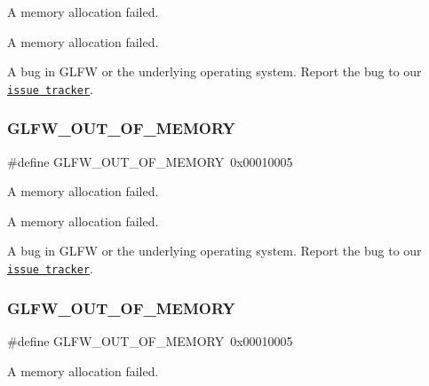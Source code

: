 A memory allocation failed. 

A memory allocation failed.

A bug in G\+L\+FW or the underlying operating system. Report the bug to our \href{https://github.com/glfw/glfw/issues}{\tt issue tracker}. \mbox{\label{group__errors_ga9023953a2bcb98c2906afd071d21ee7f}} 
\subsubsection{\texorpdfstring{G\+L\+F\+W\+\_\+\+O\+U\+T\+\_\+\+O\+F\+\_\+\+M\+E\+M\+O\+RY}{GLFW\_OUT\_OF\_MEMORY}\hspace{0.1cm}{\footnotesize\ttfamily [4/5]}}
{\footnotesize\ttfamily \#define G\+L\+F\+W\+\_\+\+O\+U\+T\+\_\+\+O\+F\+\_\+\+M\+E\+M\+O\+RY~0x00010005}



A memory allocation failed. 

A memory allocation failed.

A bug in G\+L\+FW or the underlying operating system. Report the bug to our \href{https://github.com/glfw/glfw/issues}{\tt issue tracker}. \mbox{\label{group__errors_ga9023953a2bcb98c2906afd071d21ee7f}} 
\subsubsection{\texorpdfstring{G\+L\+F\+W\+\_\+\+O\+U\+T\+\_\+\+O\+F\+\_\+\+M\+E\+M\+O\+RY}{GLFW\_OUT\_OF\_MEMORY}\hspace{0.1cm}{\footnotesize\ttfamily [5/5]}}
{\footnotesize\ttfamily \#define G\+L\+F\+W\+\_\+\+O\+U\+T\+\_\+\+O\+F\+\_\+\+M\+E\+M\+O\+RY~0x00010005}



A memory allocation failed. 

